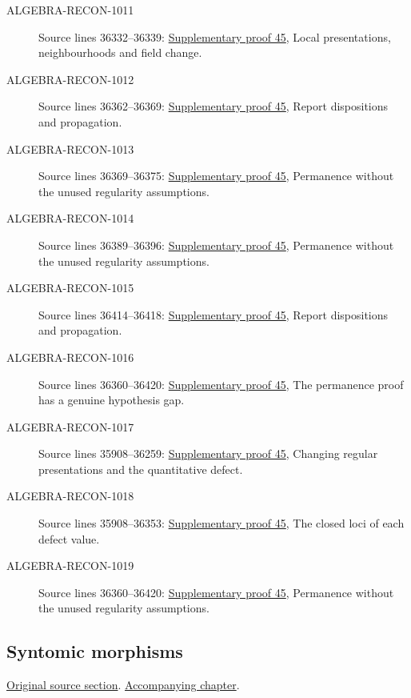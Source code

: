\begin{description}
\item[ALGEBRA-RECON-1011] Source lines 36332--36339: \hyperlink{algebra_lci_notes_20260928}{Supplementary proof 45}, Local presentations, neighbourhoods and field change.
\item[ALGEBRA-RECON-1012] Source lines 36362--36369: \hyperlink{algebra_lci_notes_20260928}{Supplementary proof 45}, Report dispositions and propagation.
\item[ALGEBRA-RECON-1013] Source lines 36369--36375: \hyperlink{algebra_lci_notes_20260928}{Supplementary proof 45}, Permanence without the unused regularity assumptions.
\item[ALGEBRA-RECON-1014] Source lines 36389--36396: \hyperlink{algebra_lci_notes_20260928}{Supplementary proof 45}, Permanence without the unused regularity assumptions.
\item[ALGEBRA-RECON-1015] Source lines 36414--36418: \hyperlink{algebra_lci_notes_20260928}{Supplementary proof 45}, Report dispositions and propagation.
\item[ALGEBRA-RECON-1016] Source lines 36360--36420: \hyperlink{algebra_lci_notes_20260928}{Supplementary proof 45}, The permanence proof has a genuine hypothesis gap.
\item[ALGEBRA-RECON-1017] Source lines 35908--36259: \hyperlink{algebra_lci_notes_20260928}{Supplementary proof 45}, Changing regular presentations and the quantitative defect.
\item[ALGEBRA-RECON-1018] Source lines 35908--36353: \hyperlink{algebra_lci_notes_20260928}{Supplementary proof 45}, The closed loci of each defect value.
\item[ALGEBRA-RECON-1019] Source lines 36360--36420: \hyperlink{algebra_lci_notes_20260928}{Supplementary proof 45}, Permanence without the unused regularity assumptions.
\end{description}

\subsection{Syntomic morphisms}
\hypertarget{algebra-source-section-syntomic}{}
\noindent\href{https://github.com/stacks/stacks-project/blob/a04446e57ec1fbc252a871afcec7752fb2807b14/algebra.tex\#L36427}{Original source section}. \href{algebra.pdf\#nameddest=section-syntomic}{Accompanying chapter}.

